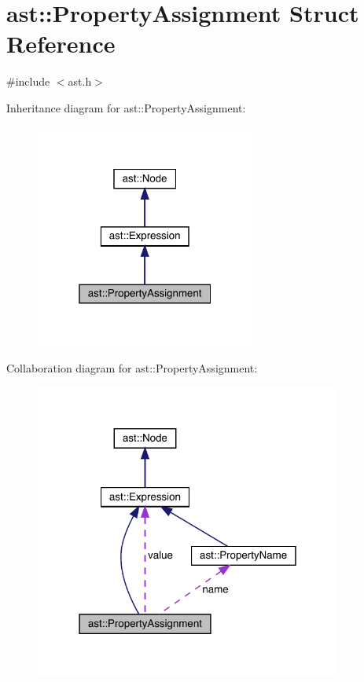 \hypertarget{structast_1_1_property_assignment}{}\section{ast\+:\+:Property\+Assignment Struct Reference}
\label{structast_1_1_property_assignment}


{\ttfamily \#include $<$ast.\+h$>$}



Inheritance diagram for ast\+:\+:Property\+Assignment\+:
\nopagebreak
\begin{figure}[H]
\begin{center}
\leavevmode
\includegraphics[width=205pt]{structast_1_1_property_assignment__inherit__graph}
\end{center}
\end{figure}


Collaboration diagram for ast\+:\+:Property\+Assignment\+:
\nopagebreak
\begin{figure}[H]
\begin{center}
\leavevmode
\includegraphics[width=286pt]{structast_1_1_property_assignment__coll__graph}
\end{center}
\end{figure}
